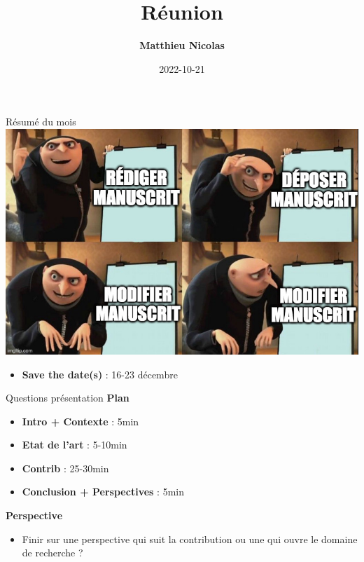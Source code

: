 \documentclass[12pt]{beamer}
\date{2022-10-21}
\author{
  \textbf{Matthieu Nicolas}
}
\title{Réunion}
\subtitle{}
\institute{}
\begin{document}
\maketitle

\begin{frame}{Résumé du mois}
  \centering
  \includegraphics[width=0.9 \linewidth]{img/meme.jpg}
  \pause
  \begin{itemize}
    \item \textbf{Save the date(s)} : 16-23 décembre
  \end{itemize}
\end{frame}

\begin{frame}{Questions présentation}
  \textbf{Plan}
  \begin{itemize}
    \item \textbf{Intro + Contexte} : 5min
    \item \textbf{Etat de l'art} : 5-10min
    \item \textbf{Contrib} : 25-30min
    \item \textbf{Conclusion + Perspectives} : 5min
  \end{itemize}
  \pause
  \textbf{Perspective}
  \begin{itemize}
    \item Finir sur une perspective qui suit la contribution ou une qui ouvre le domaine de recherche ?
  \end{itemize}
\end{frame}
\end{document}
